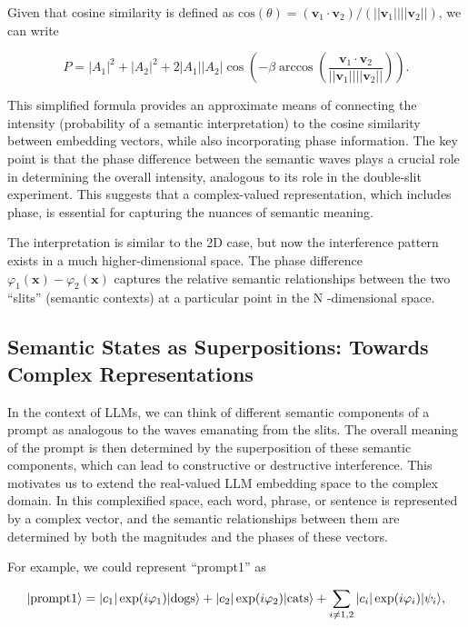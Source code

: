 \documentclass[prd,amsmath,amssymb,12pt]{revtex4}
\DeclarePairedDelimiter\ket{\lvert}{\rangle}
\begin{document}
\noindent
Given that cosine similarity is defined as $\text{cos}(\theta)
 = (\mathbf{v}_1 \cdot \mathbf{v}_2)/(||\mathbf{v}_1||||\mathbf{v}_2||)$, we can write

\begin{equation}
    P = |A_1|^2 + |A_2|^2 + 2 |A_1| |A_2| \cos\left(-\beta \arccos\left(\frac{\mathbf{v}_1
    \cdot \mathbf{v}_2}{||\mathbf{v}_1||||\mathbf{v}_2||}\right)\right).
\end{equation}

\noindent
This simplified formula provides an approximate means of connecting the intensity (probability of a semantic
interpretation)
to the cosine similarity between embedding vectors, while also incorporating phase information. The key point is that
the phase difference between the semantic waves plays a crucial role in determining the overall intensity,
analogous to its role in the double-slit experiment. This suggests that a complex-valued representation,
which includes phase, is essential for capturing the nuances of semantic meaning.

The interpretation is similar to the 2D case, but now the interference pattern exists in a much higher-dimensional space.
The phase difference $\varphi_1(\mathbf{x})-\varphi_2(\mathbf{x})$ captures the relative semantic relationships between
the two ``slits'' (semantic contexts) at a particular point in the N -dimensional space.

\subsection{Semantic States as Superpositions: Towards Complex Representations}

In the context of LLMs, we can think of different semantic components of a prompt as analogous to the waves emanating
from the slits. The overall meaning of the prompt is then determined by the superposition of these semantic
components, which can lead to constructive or destructive interference. This motivates us to extend the
real-valued LLM embedding space to the complex domain. In this complexified space, each word, phrase, or
sentence is represented by a complex vector, and the semantic relationships between them are determined
by both the magnitudes and the phases of these vectors.

For example, we could represent ``prompt1'' as

\begin{equation}
    \ket{\text{prompt1}} =
    |c_1|\exp(i\varphi_1)\ket{\text{dogs}} +
    |c_2|\exp(i\varphi_2)\ket{\text{cats}} + \sum_{i\ne 1,2}  |c_i|\exp(i\varphi_i)\ket{\psi_i},
\end{equation}
\end{document}
